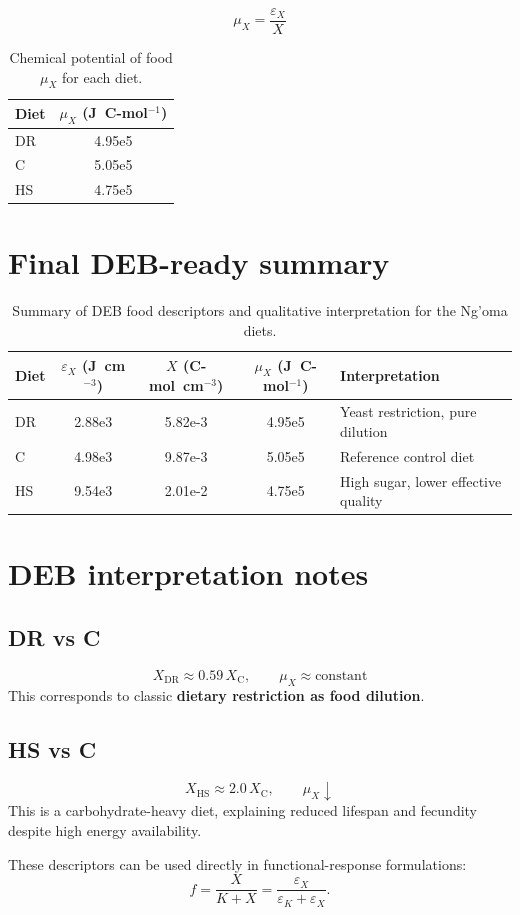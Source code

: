 \documentclass[11pt]{article}
\begin{document}
\[
  \mu_X = \frac{\varepsilon_X}{X}
\]

\begin{table}[h]
  \centering
  \begin{tabular}{lS[table-format=1.2e5]}
    \toprule
    Diet & {$\mu_X$ (J~C-mol$^{-1}$)} \\
    \midrule
    DR  & 4.95e5 \\
    C   & 5.05e5 \\
    HS  & 4.75e5 \\
    \bottomrule
  \end{tabular}
  \caption{Chemical potential of food $\mu_X$ for each diet.}
\end{table}

\section{Final DEB-ready summary}

\begin{table}[h]
  \centering
  \begin{tabular}{lS[table-format=1.2e1]S[table-format=1.2e-2]S[table-format=1.2e5]l}
    \toprule
    Diet & {$\varepsilon_X$ (J~cm$^{-3}$)} & {$X$ (C-mol~cm$^{-3}$)} & {$\mu_X$ (J~C-mol$^{-1}$)} & Interpretation \\
    \midrule
    DR & 2.88e3 & 5.82e-3 & 4.95e5 & Yeast restriction, pure dilution \\
    C  & 4.98e3 & 9.87e-3 & 5.05e5 & Reference control diet \\
    HS & 9.54e3 & 2.01e-2 & 4.75e5 & High sugar, lower effective quality \\
    \bottomrule
  \end{tabular}
  \caption{Summary of DEB food descriptors and qualitative interpretation for the Ng'oma diets.}
\end{table}

\section{DEB interpretation notes}

\subsection*{DR vs C}
\[
  X_{\mathrm{DR}} \approx 0.59\,X_{\mathrm{C}},\qquad \mu_X \approx \text{constant}
\]
This corresponds to classic \textbf{dietary restriction as food dilution}.

\subsection*{HS vs C}
\[
  X_{\mathrm{HS}} \approx 2.0\,X_{\mathrm{C}},\qquad \mu_X \downarrow
\]
This is a carbohydrate-heavy diet, explaining reduced lifespan and fecundity despite high energy availability.

These descriptors can be used directly in functional-response formulations:
\[
  f = \frac{X}{K + X} = \frac{\varepsilon_X}{\varepsilon_K + \varepsilon_X}.
\]
\end{document}
